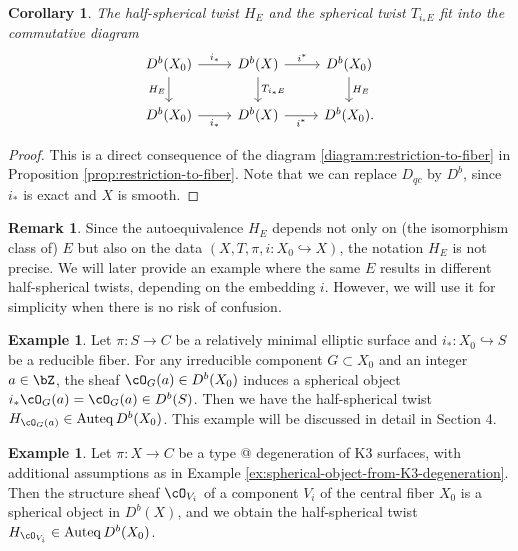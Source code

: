 \documentclass{amsart}
\makeatletter
\numberwithin{equation}{section}
\theoremstyle{plain}
\newtheorem{corollary}[theorem]{Corollary}
\theoremstyle{definition}
\newtheorem{example}[theorem]{Example}
\newtheorem{remark}[theorem]{Remark}
\DeclareMathOperator{\Auteq}{\mathrm{Auteq}}
\newcommand*{\rom}[1]{\expandafter\@slowromancap\romannumeral #1@}
\makeatother
\begin{document}
\begin{corollary}\label{cor:compatibility-of-half-spherical-twists-and-spherical-twists}
    The half-spherical twist $H_E$ and the spherical twist $T_{i_*E}$ fit into the commutative diagram
    \begin{equation}
        \begin{tikzcd}
            D^b(X_0) \ar[r, "i_*"] \ar[d, "H_E"'] & D^b(X) \ar[r, "i^*"]\ar[d, "T_{i_*E}"] & D^b(X_0) \ar[d,  "H_E"]\\
            D^b(X_0) \ar[r, "i_*"'] & D^b(X) \ar[r, "i^*"'] & D^b(X_0).
        \end{tikzcd}
    \end{equation}
\end{corollary}
\begin{proof}
    This is a direct consequence of the diagram \eqref{diagram:restriction-to-fiber} in Proposition \ref{prop:restriction-to-fiber}.
    Note that we can replace $D_{qc}$ by $D^b$, since $i_*$ is exact and $X$ is smooth.
\end{proof}

\begin{remark}
    Since the autoequivalence $H_E$ depends not only on (the isomorphism class of) $E$ but also on the data $(X, T, \pi, i \colon X_0 \hookrightarrow X)$, the notation $H_E$ is not precise.
    We will later provide an example where the same $E$ results in different half-spherical twists, depending on the embedding $i$.
    However, we will use it for simplicity when there is no risk of confusion.
\end{remark}


\begin{example}\label{ex:half-spherical-twist-from-kodaira-fiber}
    Let $\pi \colon S \to C$ be a relatively minimal elliptic surface and $i_* \colon X_0 \hookrightarrow S$ be a reducible fiber.
    For any irreducible component $G \subset X_0$ and an integer $a \in \bZ$, the sheaf $\cO_G(a) \in D^b(X_0)$ induces a spherical object $i_*\cO_G(a)=\cO_G(a) \in D^b(S)$.
    Then we have the half-spherical twist $H_{\cO_G(a)} \in \Auteq D^b(X_0)$.
    This example will be discussed in detail in Section 4.
\end{example}


\begin{example}\label{ex:K3-degeneration}
    Let $\pi \colon X \to C$ be a type \rom{3} degeneration of K3 surfaces, with additional assumptions as in Example \ref{ex:spherical-object-from-K3-degeneration}.
    Then the structure sheaf $\cO_{V_i}$ of a component $V_i$ of the central fiber $X_0$ is a spherical object in $D^b(X)$, and we obtain the half-spherical twist $H_{\cO_{V_i}} \in \Auteq D^b(X_0)$.
\end{example}
\end{document}
